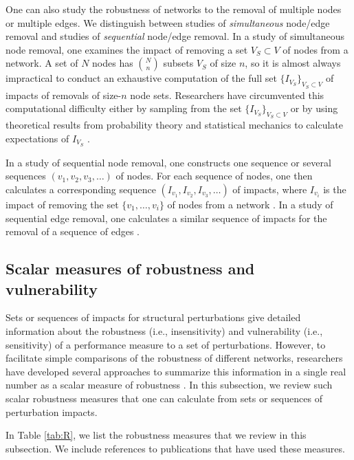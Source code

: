 \documentclass{comnet-mod}
\begin{document}
One can also study the robustness of networks to the removal of multiple nodes or multiple edges. We distinguish between studies of \textit{simultaneous} node/edge removal and studies of \textit{sequential} node/edge removal. In a study of simultaneous node removal, one examines the impact of removing a set $V_S\subset V$ of nodes from a network. A set of $N$ nodes has $\binom{N}{n}$ subsets $V_S$ of size $n$, so it is almost always impractical to conduct an exhaustive computation of the full set $\{I_{V_S}\}_{V_S\subset V}$ of impacts of removals of size-$n$ node sets. Researchers have circumvented this computational difficulty either by sampling from the set $\{I_{V_S}\}_{V_S\subset V}$ \cite{Tang2016} or by using theoretical results from probability theory and statistical mechanics to calculate expectations of $I_{V_S}$ \cite{Cohen2000, Boguna2005, Cohen2010}. 

In a study of sequential node removal, one constructs one sequence or several sequences $(v_1,v_2,v_3,\ldots)$ of nodes. For each sequence of nodes, one then calculates a corresponding sequence $(I_{v_1},I_{v_2},I_{v_3},\ldots)$ of impacts, where $I_{v_i}$ is the impact of removing the set $\{v_1,\ldots,v_i\}$ of nodes from a network \cite{Albert2000, Iyer2013, Ventresca2014}. In a study of sequential edge removal, one calculates a similar sequence of impacts for the removal of a sequence of edges \cite{Zeng2012, Hossain2013}.


\subsection{Scalar measures of robustness and vulnerability}\label{sec:scalar_robustness}

Sets or sequences of impacts for structural perturbations give detailed information about the robustness (i.e., insensitivity) and vulnerability (i.e., sensitivity) of a performance measure to a set of perturbations. 
However, to facilitate simple comparisons of the robustness of different networks, researchers have developed several approaches to summarize this information in a single real number as a scalar measure of robustness \cite{Latora2005, Schneider2011, Wang2014}. In this subsection, we review such scalar robustness measures that one can calculate from sets or sequences of perturbation impacts. 

In Table \ref{tab:R}, we list the robustness measures that we review in this subsection. We include references to publications that have used these measures.
\end{document}
